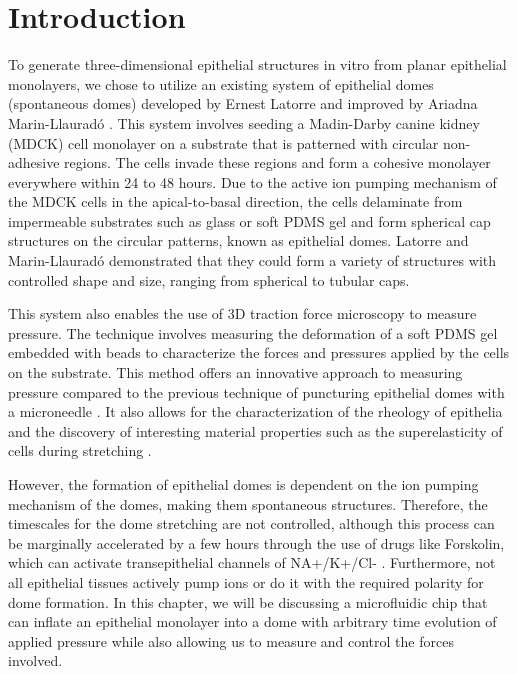 \hypertarget{introduction}{%
\section{Introduction}\label{introduction1}}

To generate three-dimensional epithelial structures in vitro from planar epithelial monolayers, we chose to utilize an existing system of epithelial domes (spontaneous domes) developed by Ernest Latorre and improved by Ariadna Marin-Llauradó  \cite{latorre2018,marin-llaurado2022}. This system involves seeding a Madin-Darby canine kidney (MDCK) cell monolayer on a substrate that is patterned with circular non-adhesive regions. The cells invade these regions and form a cohesive monolayer everywhere within 24 to 48 hours. Due to the active ion pumping mechanism of the MDCK cells in the apical-to-basal direction, the cells delaminate from impermeable substrates such as glass or soft PDMS gel and form spherical cap structures on the circular patterns, known as epithelial domes. Latorre and Marin-Llauradó demonstrated that they could form a variety of structures with controlled shape and size, ranging from spherical to tubular caps.  

This system also enables the use of 3D traction force microscopy to measure pressure. The technique involves measuring the deformation of a soft PDMS gel embedded with beads to characterize the forces and pressures applied by the cells on the substrate. This method offers an innovative approach to measuring pressure compared to the previous technique of puncturing epithelial domes with a microneedle \cite{tanner1983, choudhury2022}. It also allows for the characterization of the rheology of epithelia and the discovery of interesting material properties such as the superelasticity of cells during stretching \cite{latorre2018}.  

However, the formation of epithelial domes is dependent on the ion pumping mechanism of the domes, making them spontaneous structures. Therefore, the timescales for the dome stretching are not controlled, although this process can be marginally accelerated by a few hours through the use of drugs like Forskolin, which can activate transepithelial channels of NA+/K+/Cl- \cite{klebe1995,bourke1987}. Furthermore, not all epithelial tissues actively pump ions or do it with the required polarity for dome formation. In this chapter, we will be discussing a microfluidic chip that can inflate an epithelial monolayer into a dome with arbitrary time evolution of applied pressure while also allowing us to measure and control the forces involved.


